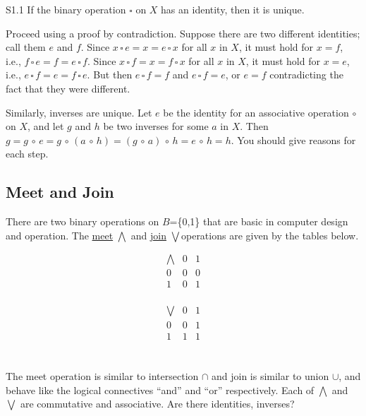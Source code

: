 \documentclass[12pt]{book}
\theoremstyle{definition}
\begin{document}
\begin{tctheorem}{}{S1.1}
If the binary operation $\square$ on $X$ has an identity, then it is unique.
\end{tctheorem}
\begin{newproof}
Proceed using a proof by contradiction.  Suppose there are two different identities; call them $e$ and $f$.  Since $x\,\square\, e=x=e\,\square\, x$ for all $x$ in $X$, it must hold for $x=f$, i.e., $f\,\square\, e= f = e\,\square\, f$.  Since $x\,\square\, f=x=f\,\square\, x$ for all $x$ in $X$, it must hold for $x=e$, i.e., $e\,\square\, f=e=f\,\square\, e$.  But then $e\,\square\, f=f$ and $e\,\square\, f =e$, or $e=f$ contradicting the fact that they were different.
\end{newproof}
Similarly, inverses are  unique.  Let $e$ be the identity for an associative operation $\circ$ on $X$, and let $g$ and $h$ be two inverses for some $a$ in $X$.  Then $g=g\,\circ\, e=g\,\circ\,(a\,\circ\, h)=(g\,\circ\, a)\,\circ\, h=e\,\circ\, h = h$.  You should give reasons for each step.

\subsection{Meet and Join}
There are two binary operations on $B$=\{0,1\} that are basic in computer design and operation.  The \underline{meet} $\bigwedge$ and \underline{join} $\bigvee$operations are given by the tables below.\\[.3in]
\begin{minipage}{3in}
$$\begin{array}{c|cc}
\bigwedge & 0 & 1\\
\hline
0 & 0 & 0\\
1& 0 & 1\\
\end{array}$$
\end{minipage}
\begin{minipage}{3.5in}
$$\begin{array}{c|cc}
\bigvee & 0 & 1\\
\hline
0 & 0 & 1\\
1& 1 & 1\\
\end{array}$$
\end{minipage}\\[.3in]
The meet operation is similar to intersection $\cap$ and join is similar to union $\cup$, and behave like the logical connectives ``and'' and ``or'' respectively.  Each of $\bigwedge$ and $\bigvee$ are commutative and associative.  Are there identities, inverses?
\end{document}
